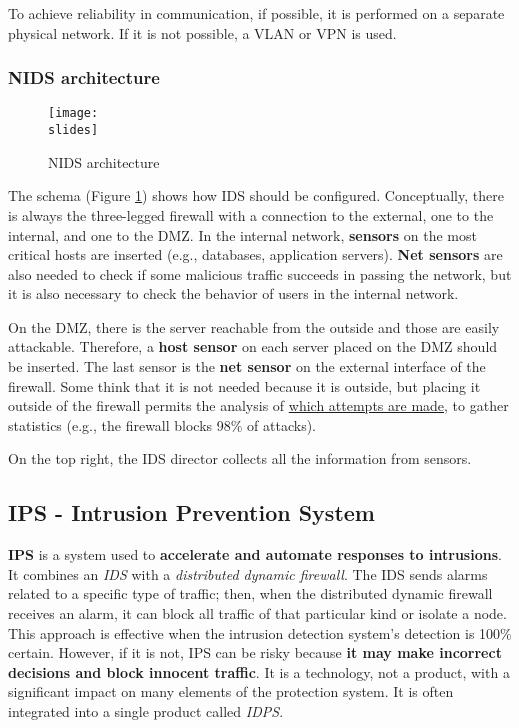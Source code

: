 To achieve reliability in communication, if possible, it is performed on a separate physical network. If it is not possible, a VLAN or VPN is used.


\subsubsection{NIDS architecture}
\begin{figure}[h]
    \centering
    \texttt{[image: \\slides]}
    \caption{NIDS architecture}
    \label{fig:nids-architecture}
\end{figure}

The schema (Figure \ref{fig:nids-architecture}) shows how IDS should be configured. Conceptually, there is always the three-legged firewall with a connection to the external, one to the internal, and one to the DMZ. In the internal network, \textbf{sensors} on the most critical hosts are inserted (e.g., databases, application servers). \textbf{Net sensors} are also needed to check if some malicious traffic succeeds in passing the network, but it is also necessary to check the behavior of users in the internal network.

On the DMZ, there is the server reachable from the outside and those are easily attackable. Therefore, a \textbf{host sensor} on each server placed on the DMZ should be inserted. The last sensor is the \textbf{net sensor} on the external interface of the firewall. Some think that it is not needed because it is outside, but placing it outside of the firewall permits the analysis of \underline{which attempts are made}, to gather statistics (e.g., the firewall blocks 98\% of attacks).

On the top right, the IDS director collects all the information from sensors.

\subsection{IPS - Intrusion Prevention System}

\textbf{IPS} is a system used to \textbf{accelerate and automate responses to intrusions}. It combines an \textit{IDS} with a \textit{ distributed dynamic firewall}. The IDS sends alarms related to a specific type of traffic; then, when the distributed dynamic firewall receives an alarm, it can block all traffic of that particular kind or isolate a node. This approach is effective when the intrusion detection system's detection is 100\% certain. However, if it is not, IPS can be risky because \textbf{it may make incorrect decisions and block innocent traffic}. It is a technology, not a product, with a significant impact on many elements of the protection system. 
It is often integrated into a single product called \textit{IDPS}.




